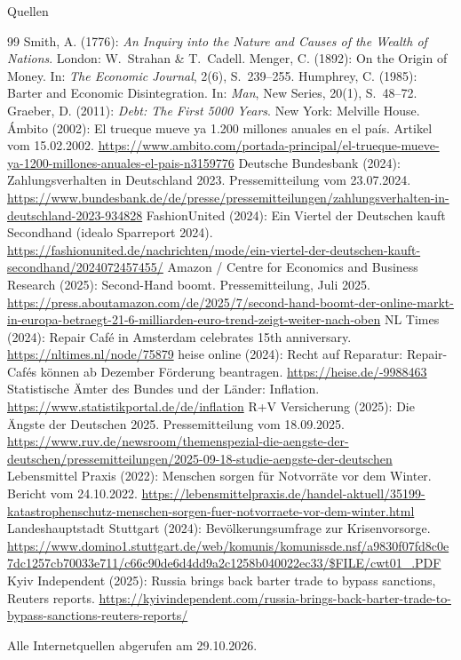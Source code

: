 \documentclass[aspectratio=169, 11pt]{beamer}
\begin{document}
\begin{frame}[allowframebreaks]{Quellen}
\begin{thebibliography}{99}
\tiny\setlength{\itemsep}{1pt}
 Smith, A. (1776): \emph{An Inquiry into the Nature and
    Causes of the Wealth of Nations}. London: W.~Strahan \& T.~Cadell.
 Menger, C. (1892): On the Origin of Money. In:
    \emph{The Economic Journal}, 2(6), S.~239--255.
 Humphrey, C. (1985): Barter and Economic
    Disintegration. In: \emph{Man}, New Series, 20(1), S.~48--72.
 Graeber, D. (2011): \emph{Debt: The First 5000 Years}.
    New York: Melville House.
 Ámbito (2002): El trueque mueve ya 1.200 millones
    anuales en el país. Artikel vom 15.02.2002.
    \url{https://www.ambito.com/portada-principal/el-trueque-mueve-ya-1200-millones-anuales-el-pais-n3159776}
 Deutsche Bundesbank (2024): Zahlungsverhalten in
    Deutschland 2023. Pressemitteilung vom 23.07.2024.
    \url{https://www.bundesbank.de/de/presse/pressemitteilungen/zahlungsverhalten-in-deutschland-2023-934828}
 FashionUnited (2024): Ein Viertel der Deutschen kauft
    Secondhand (idealo Sparreport 2024).
    \url{https://fashionunited.de/nachrichten/mode/ein-viertel-der-deutschen-kauft-secondhand/2024072457455/}
 Amazon / Centre for Economics and Business Research (2025):
    Second-Hand boomt. Pressemitteilung, Juli 2025.
    \url{https://press.aboutamazon.com/de/2025/7/second-hand-boomt-der-online-markt-in-europa-betraegt-21-6-milliarden-euro-trend-zeigt-weiter-nach-oben}
 NL Times (2024): Repair Café in Amsterdam celebrates
    15th anniversary. \url{https://nltimes.nl/node/75879}
 heise online (2024): Recht auf Reparatur: Repair-Cafés
    können ab Dezember Förderung beantragen. \url{https://heise.de/-9988463}
 Statistische Ämter des Bundes und der Länder:
    Inflation. \url{https://www.statistikportal.de/de/inflation}
 R+V Versicherung (2025): Die Ängste der Deutschen 2025.
    Pressemitteilung vom 18.09.2025.
    \url{https://www.ruv.de/newsroom/themenspezial-die-aengste-der-deutschen/pressemitteilungen/2025-09-18-studie-aengste-der-deutschen}
 Lebensmittel Praxis (2022): Menschen sorgen für
    Notvorräte vor dem Winter. Bericht vom 24.10.2022.
    \url{https://lebensmittelpraxis.de/handel-aktuell/35199-katastrophenschutz-menschen-sorgen-fuer-notvorraete-vor-dem-winter.html}
 Landeshauptstadt Stuttgart (2024): Bevölkerungsumfrage
    zur Krisenvorsorge.
    \url{https://www.domino1.stuttgart.de/web/komunis/komunissde.nsf/a9830f07fd8c0e7dc1257cb70033e711/c66c90de6d4dd9a2c1258b040022ec33/$FILE/cwt01_.PDF}
 Kyiv Independent (2025): Russia brings back barter trade
    to bypass sanctions, Reuters reports.
    \url{https://kyivindependent.com/russia-brings-back-barter-trade-to-bypass-sanctions-reuters-reports/}
\end{thebibliography}

    \vspace{0.2cm}
    {\scriptsize Alle Internetquellen abgerufen am 29.10.2026.}
\end{frame}
\end{document}
